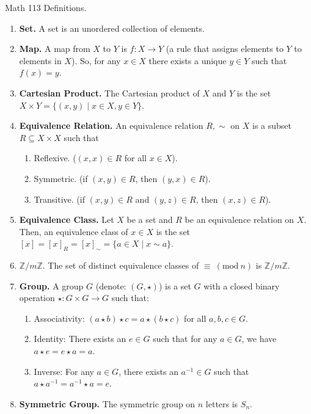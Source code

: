 \documentclass[12pt]{article}
\theoremstyle{definition}
\theoremstyle{named}
\newcommand{\Mod}[1]{\ (\mathrm{mod}\ #1)}
\begin{document}
\begin{center}
    Math 113 Definitions. 
\end{center}

\begin{enumerate}
    \item \textbf{Set. } A set is an unordered collection of elements. 
    \item \textbf{Map. } A map from $X$ to $Y$ is $f: X \to Y$ (a rule that assigns elements to $Y$ to elements in $X$). So, for any $x \in X$ there exists a unique $y \in Y$ such that $f(x)=y$. 
    \item \textbf{Cartesian Product. } The Cartesian product of $X$ and $Y$ is the set $X \times Y = \{(x,y) \mid x \in X, y \in Y\}$. 
    \item \textbf{Equivalence Relation. } An equivalence relation $R,\sim$ on $X$ is a subset $R \subseteq X \times X$ such that
    \begin{enumerate}
        \item Reflexive. ($(x,x) \in R$ for all $x \in X$). 
        \item Symmetric. (if $(x,y) \in R$, then $(y,x) \in R$). 
        \item Transitive. (if $(x,y) \in R$ and $(y,z) \in R$, then $(x,z) \in R$). 
    \end{enumerate}
    \item \textbf{Equivalence Class. } Let $X$ be a set and $R$ be an equivalence relation on $X$. Then, an equivalence class of $x\in  X$ is the set $[x]=[x]_R=[x]_{\sim} = \{a \in X \mid x \sim a\}$. 
    \item \textbf{$\mathbb{Z}/m\mathbb{Z}. $} The set of distinct equivalence classes of $\equiv \Mod{n}$ is $\mathbb{Z}/m\mathbb{Z}$.
	\item \textbf{Group. } A group $G$ (denote: $(G,\star)$) is a set $G$ with a closed binary operation $\star: G \times G \to G$ such that: 
	\begin{enumerate}
		\item Associativity: $(a \star b) \star c = a \star (b \star c)$ for all $a,b,c \in G$. 
		\item Identity: There exists an $e \in G$ such that for any $a \in G$, we have $a \star e = e \star a = a$. 
		\item Inverse: For any $a \in G$, there exists an $a^{-1} \in G$ such that $a \star a^{-1} = a^{-1} \star a = e$. 
	\end{enumerate}
	\item \textbf{Symmetric Group. } The symmetric group on $n$ letters is $S_n$. 

\end{enumerate}
\end{document}
